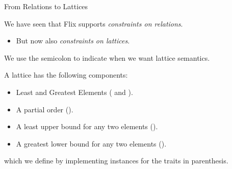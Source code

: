 \begin{frame}{From Relations to Lattices}

We have seen that Flix supports \emph{constraints on relations}. 

\begin{itemize}
    \item But now also \emph{constraints on lattices}.
\end{itemize}

We use the semicolon \Code{;} to indicate when we want lattice semantics.

A lattice has the following components:

\begin{itemize}
    \item Least and Greatest Elements ( and ).
    \item A partial order ().
    \item A least upper bound for any two elements ().
    \item A greatest lower bound for any two elements ().
\end{itemize}

which we define by implementing instances for the traits in parenthesis.

\end{frame}

